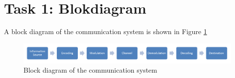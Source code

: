 \documentclass[final]{scrreprt} %
\begin{document}
\section{Task 1: Blokdiagram}
A block diagram of the communication system is shown in Figure \ref{fig:blok}
\begin{figure}[h]
	\includegraphics[width=\linewidth]{resources/blokdiagram.png}
	\caption{Block diagram of the communication system}
	\label{fig:blok}
\end{figure}
\end{document}
